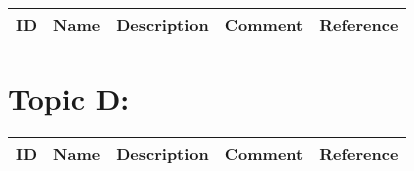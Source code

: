 \begin{table}[H]\centering
\begin{tabular}{p{1cm}p{2cm}p{3cm}p{3cm}p{1cm}}
ID & Name & Description & Comment & Reference \\
\hline
\hline
\end{tabular}
\end{table}

\section{Topic D:}

\begin{table}[H]\centering
\begin{tabular}{p{1cm}p{2cm}p{3cm}p{3cm}p{1cm}}
ID & Name & Description & Comment & Reference \\
\hline
\hline
\end{tabular}
\end{table}
